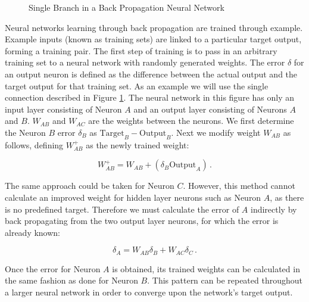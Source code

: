 \begin{figure}[ht]
	\centering
	
	\caption{Single Branch in a Back Propagation Neural Network}
	\label{fig:backprop}
\end{figure}

Neural networks learning through back propagation are trained through example.  Example inputs (known as training sets) are linked to a particular target output, forming a training pair.  The first step of training is to pass in an arbitrary training set to a neural network with randomly generated weights.  The error $\delta$ for an output neuron is defined as the difference between the actual output and the target output for that training set. As an example we will use the single connection described in Figure \ref{fig:backprop}. The neural network in this figure has only an input layer consisting of Neuron $A$ and an output layer consisting of Neurons $A$ and $B$. $W_{AB}$  and $W_{AC}$ are the weights between the neurons. We first determine the Neuron $B$ error $\delta_B$ as $\text{Target}_B - \text{Output}_B$.   Next we modify weight $W_{AB}$ as follows, defining $W_{AB}^{+}$ as the newly trained weight:

\begin{equation}
	W_{AB}^{+} = W_{AB} + (\delta_B \text{Output}_A)\,.
\end{equation}

The same approach could be taken for Neuron $C$.  However, this method cannot calculate an improved weight for hidden layer neurons such as Neuron $A$, as there is no predefined target.  Therefore we must calculate the error of $A$ indirectly by back propagating from the two output layer neurons, for which the error is already known:

\begin{equation}
	\delta_A = W_{AB}\delta_B + W_{AC}\delta_C \,.
\end{equation}

Once the error for Neuron $A$ is obtained, its trained weights can be calculated in the same fashion as done for Neuron $B$.  This pattern can be repeated throughout a larger neural network in order to converge upon the network's target output.
